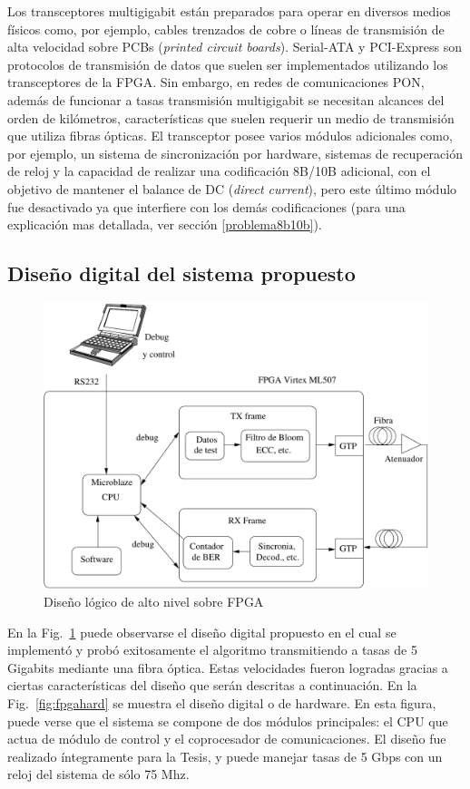 Los transceptores multigigabit están preparados para operar en diversos medios físicos como, por ejemplo, cables trenzados de cobre o líneas de transmisión de alta velocidad sobre PCBs (\textit{printed circuit boards}). Serial-ATA \cite{serial2001high} y PCI-Express \cite{budruk2004pci} son protocolos de transmisión de datos que suelen ser implementados utilizando los transceptores de la FPGA. Sin embargo, en redes de comunicaciones PON, además de funcionar a tasas transmisión  multigigabit se necesitan alcances del orden de kilómetros, características que suelen requerir un medio de transmisión que utiliza fibras ópticas.  El transceptor posee varios módulos adicionales como, por ejemplo, un sistema de sincronización por hardware, sistemas de recuperación de reloj y la capacidad de realizar una codificación 8B/10B \cite{widmer1983dc} adicional, con el objetivo de mantener el balance de DC (\textit{direct current}), pero este último módulo fue desactivado ya que interfiere con los demás codificaciones (para una explicación mas detallada, ver sección \ref{problema8b10b}).

\subsection{Diseño digital del sistema propuesto}
\begin{figure}[t]
  \centering
    \includegraphics[width=6in]{graphs/fpgadesign.pdf}
\caption {Diseño lógico de alto nivel sobre FPGA}
\label{fig:fpgadesign}
\end{figure}

En la Fig.~\ref{fig:fpgadesign} puede observarse el diseño digital propuesto en el cual se implementó y probó exitosamente el algoritmo transmitiendo a tasas de 5 Gigabits mediante una fibra óptica.
Estas velocidades fueron logradas gracias a ciertas características del diseño que serán descritas a continuación. En la Fig.~\ref{fig:fpgahard} se muestra el diseño digital o de hardware. En esta figura, puede verse que el sistema se compone de dos módulos principales: el CPU que actua de módulo de control y el coprocesador de comunicaciones. El diseño fue realizado íntegramente para la Tesis, y puede manejar tasas de 5 Gbps con un reloj del sistema de sólo 75 Mhz.

